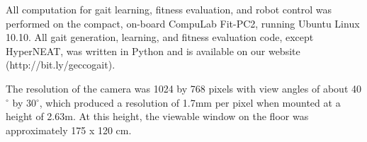 \documentclass[portrait,final]{baposter}
\begin{document}
\begin{poster}
{    \vspace{.5em}

    All computation for gait learning, fitness evaluation, and
    robot control was performed on the compact, on-board CompuLab
    Fit-PC2, running Ubuntu Linux 10.10.  All gait generation,
    learning, and fitness evaluation code, except HyperNEAT, was
    written in Python and is available on our website
    (http://bit.ly/geccogait).

%




The
resolution of the camera was 1024 by 768 pixels with view angles of
about 40$^\circ$ by 30$^\circ$, which produced a resolution of 1.7mm
per pixel when mounted at a height of 2.63m.  At this height, the
viewable window on the floor was approximately 175 x 120 cm.

    \vspace{.5em}

}

\end{poster}
\end{document}
